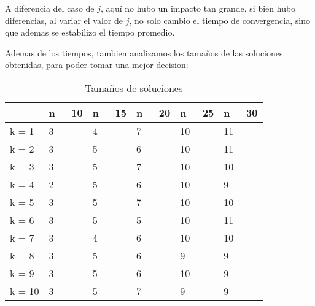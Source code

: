 A diferencia del caso de $j$, aquí no hubo un impacto tan grande, si bien hubo diferencias, al variar el valor de $j$, no solo cambio el tiempo de convergencia, sino que ademas se estabilizo el tiempo promedio.

Ademas de los tiempos, tambien analizamos los tamaños de las soluciones obtenidas, para poder tomar una mejor decision:

\begin{table}[H]
\centering
\caption{Tamaños de soluciones}
\label{my-label}
\begin{tabular}{|l|lllll|}
\hline
       & \multicolumn{1}{l|}{n = 10} & \multicolumn{1}{l|}{n = 15} & \multicolumn{1}{l|}{n = 20} & \multicolumn{1}{l|}{n = 25} & n = 30 \\ \hline
k = 1  & 3                           & 4                           & 7                           & 10                          & 11     \\ \cline{1-1}
k = 2  & 3                           & 5                           & 6                           & 10                          & 11     \\ \cline{1-1}
k = 3  & 3                           & 5                           & 7                           & 10                          & 10     \\ \cline{1-1}
k = 4  & 2                           & 5                           & 6                           & 10                          & 9      \\ \cline{1-1}
k = 5  & 3                           & 5                           & 7                           & 10                          & 10     \\ \cline{1-1}
k = 6  & 3                           & 5                           & 5                           & 10                          & 11     \\ \cline{1-1}
k = 7  & 3                           & 4                           & 6                           & 10                          & 10     \\ \cline{1-1}
k = 8  & 3                           & 5                           & 6                           & 9                           & 9      \\ \cline{1-1}
k = 9  & 3                           & 5                           & 6                           & 10                          & 9      \\ \cline{1-1}
k = 10 & 3                           & 5                           & 7                           & 9                           & 9      \\ \cline{1-1}

\end{tabular}
\end{table}
